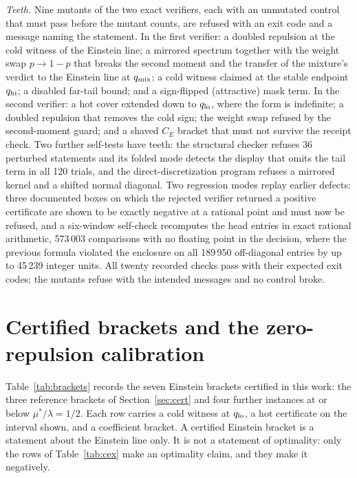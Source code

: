 \documentclass[11pt]{article}
\newcommand{\muS}{\mu^{*}}
\theoremstyle{definition}
\theoremstyle{remark}
\begin{document}
\emph{Teeth.} Nine mutants of the two exact verifiers, each with an unmutated control
that must pass before the mutant counts, are refused with an exit code and a message
naming the statement. In the first verifier: a doubled repulsion at the cold witness of
the Einstein line; a mirrored spectrum together with the weight swap $p\to1-p$ that breaks
the second moment and the transfer of the mixture's verdict to the Einstein line at
$q_{\rm mix}$; a cold witness claimed at the stable endpoint $q_{\rm hi}$; a disabled
far-tail bound; and a sign-flipped (attractive) mask term. In the second verifier: a hot
cover extended down to $q_{\rm lo}$, where the form is indefinite; a doubled repulsion
that removes the cold sign; the weight swap refused by the second-moment guard; and a
shaved $C_E$ bracket that must not survive the receipt check. Two further self-tests have
teeth: the structural checker refuses 36 perturbed statements and its folded mode detects
the display that omits the tail term in all 120 trials, and the direct-discretization
program refuses a mirrored kernel and a shifted normal diagonal. Two regression modes
replay earlier defects: three documented boxes on which the rejected verifier returned a
positive certificate are shown to be exactly negative at a rational point and must now be
refused, and a six-window self-check recomputes the head entries in exact rational
arithmetic, 573\,003 comparisons with no floating point in the decision, where the
previous formula violated the enclosure on all 189\,950 off-diagonal entries by up to
45\,239 integer units. All twenty recorded checks pass with their expected exit codes;
the mutants refuse with the intended messages and no control broke.

\section{Certified brackets and the zero-repulsion calibration}\label{sec:brackets}

Table~\ref{tab:brackets} records the seven Einstein brackets certified in this work: the
three reference brackets of Section~\ref{sec:cert} and four further instances at or below
$\muS/\lambda=1/2$. Each row carries a cold witness at $q_{\rm lo}$, a hot certificate on
the interval shown, and a coefficient bracket. A certified Einstein bracket is a statement
about the Einstein line only. It is not a statement of optimality: only the rows of
Table~\ref{tab:cex} make an optimality claim, and they make it negatively.
\end{document}

